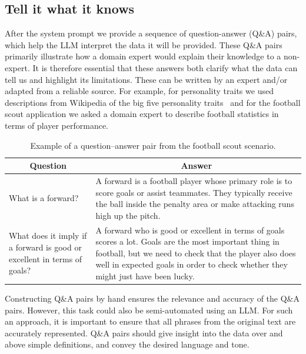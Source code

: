 \documentclass{article}
\begin{document}
\subsection{Tell it what it knows}

After the system prompt we provide a sequence of question-answer (Q\&A) pairs, which help the LLM interpret the data it will be provided. These Q\&A pairs primarily illustrate how a domain expert would explain their knowledge to a non-expert. It is therefore essential that these answers both clarify what the data can tell us and highlight its limitations. These can be written by an expert and/or adapted from a reliable source. For example, for personality traits we used descriptions from Wikipedia of the big five personality traits~\cite{matthews2003personality} and for the football scout application we asked a domain expert to describe football statistics in terms of player performance.

\begin{table}[t]
\centering
\begin{tabularx}{\linewidth}{p{2.6cm} | X}
\multicolumn{1}{c|}{\textbf{Question}} & \multicolumn{1}{c}{\textbf{Answer}} \\
\hline
What is a forward? 
& A forward is a football player whose primary role is to score goals or assist teammates. They typically receive the ball inside the penalty area or make attacking runs high up the pitch. \\

What does it imply if a forward is good or excellent in terms of goals? 
& A forward who is good or excellent in terms of goals scores a lot. Goals are the most important thing in football, but we need to check that the player also does well in expected goals in order to check whether they might just have been lucky. 
\end{tabularx}
\caption{Example of a question–answer pair from the football scout scenario.}
\label{tab:football_example}
\end{table}

Constructing Q\&A pairs by hand ensures the relevance and accuracy of the Q\&A pairs. However, this task could also be semi-automated using an LLM. For such an approach, it is important to ensure that all phrases from the original text are accurately represented. Q\&A pairs should give insight into the data over and above simple definitions, and convey the desired language and tone.
\end{document}
